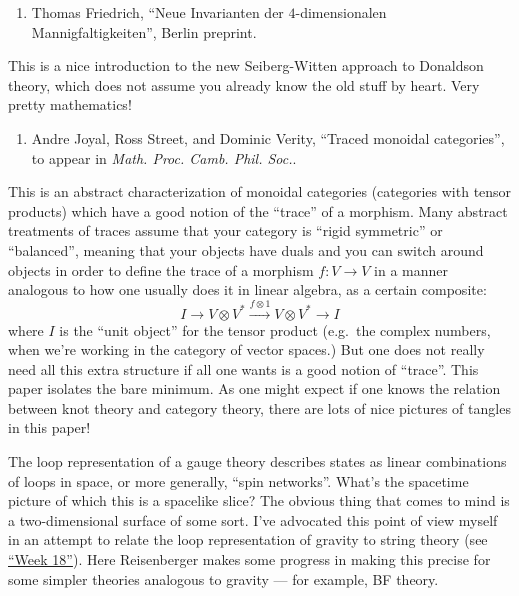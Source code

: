 \documentclass{article}
\def\tightlist{}
\renewcommand{\texttt}[1]{%
  \begingroup
  \ttfamily
  \begingroup\lccode`~=`/\lowercase{\endgroup\def~}{/\discretionary{}{}{}}%
  \begingroup\lccode`~=`[\lowercase{\endgroup\def~}{[\discretionary{}{}{}}%
  \begingroup\lccode`~=`.\lowercase{\endgroup\def~}{.\discretionary{}{}{}}%
  \catcode`/=\active\catcode`[=\active\catcode`.=\active
  \scantokens{#1\noexpand}%
  \endgroup
}
\begin{document}
\begin{enumerate}
\def\labelenumi{\arabic{enumi})}
\setcounter{enumi}{2}
\tightlist
\item
  Thomas Friedrich, ``Neue Invarianten der \(4\)-dimensionalen
  Mannigfaltigkeiten'', Berlin preprint.
\end{enumerate}

This is a nice introduction to the new Seiberg-Witten approach to
Donaldson theory, which does not assume you already know the old stuff
by heart. Very pretty mathematics!

\begin{enumerate}
\def\labelenumi{\arabic{enumi})}
\setcounter{enumi}{3}
\tightlist
\item
  Andre Joyal, Ross Street, and Dominic Verity, ``Traced monoidal
  categories'', to appear in \emph{Math. Proc. Camb. Phil. Soc.}.
\end{enumerate}

This is an abstract characterization of monoidal categories (categories
with tensor products) which have a good notion of the ``trace'' of a
morphism. Many abstract treatments of traces assume that your category
is ``rigid symmetric'' or ``balanced'', meaning that your objects have
duals and you can switch around objects in order to define the trace of
a morphism \(f\colon V \to V\) in a manner analogous to how one usually
does it in linear algebra, as a certain composite:
\[I\to V\otimes V^* \xrightarrow{f\otimes1}V\otimes V^*\to I\] where
\(I\) is the ``unit object'' for the tensor product (e.g.~the complex
numbers, when we're working in the category of vector spaces.) But one
does not really need all this extra structure if all one wants is a good
notion of ``trace''. This paper isolates the bare minimum. As one might
expect if one knows the relation between knot theory and category
theory, there are lots of nice pictures of tangles in this paper!


The loop representation of a gauge theory describes states as linear
combinations of loops in space, or more generally, ``spin networks''.
What's the spacetime picture of which this is a spacelike slice? The
obvious thing that comes to mind is a two-dimensional surface of some
sort. I've advocated this point of view myself in an attempt to relate
the loop representation of gravity to string theory (see
\protect\hyperlink{week18}{``Week 18''}). Here Reisenberger makes some
progress in making this precise for some simpler theories analogous to
gravity --- for example, BF theory.
\end{document}

